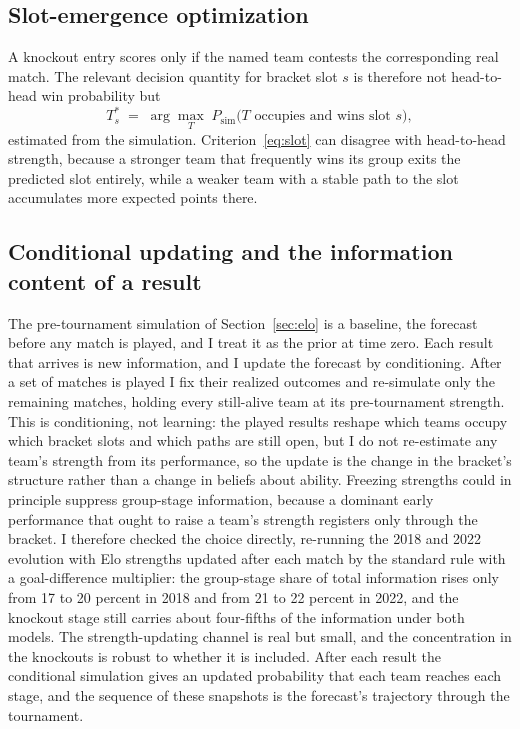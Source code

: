 \documentclass[11pt,letterpaper]{article}
\begin{document}
\subsection{Slot-emergence optimization}\label{sec:slot}

A knockout entry scores only if the named team contests the corresponding real match. The relevant decision quantity for bracket slot $s$ is therefore not head-to-head win probability but
\begin{equation}
T^\ast_s \;=\; \arg\max_T \; P_{\mathrm{sim}}\bigl(T \text{ occupies and wins slot } s\bigr),
\label{eq:slot}
\end{equation}
estimated from the simulation. Criterion~\eqref{eq:slot} can disagree with head-to-head strength, because a stronger team that frequently wins its group exits the predicted slot entirely, while a weaker team with a stable path to the slot accumulates more expected points there.

\subsection{Conditional updating and the information content of a result}\label{sec:updating}

The pre-tournament simulation of Section~\ref{sec:elo} is a baseline, the forecast before any match is played, and I treat it as the prior at time zero. Each result that arrives is new information, and I update the forecast by conditioning. After a set of matches is played I fix their realized outcomes and re-simulate only the remaining matches, holding every still-alive team at its pre-tournament strength. This is conditioning, not learning: the played results reshape which teams occupy which bracket slots and which paths are still open, but I do not re-estimate any team's strength from its performance, so the update is the change in the bracket's structure rather than a change in beliefs about ability. Freezing strengths could in principle suppress group-stage information, because a dominant early performance that ought to raise a team's strength registers only through the bracket. I therefore checked the choice directly, re-running the 2018 and 2022 evolution with Elo strengths updated after each match by the standard rule with a goal-difference multiplier: the group-stage share of total information rises only from 17 to 20 percent in 2018 and from 21 to 22 percent in 2022, and the knockout stage still carries about four-fifths of the information under both models. The strength-updating channel is real but small, and the concentration in the knockouts is robust to whether it is included. After each result the conditional simulation gives an updated probability that each team reaches each stage, and the sequence of these snapshots is the forecast's trajectory through the tournament.
\end{document}
